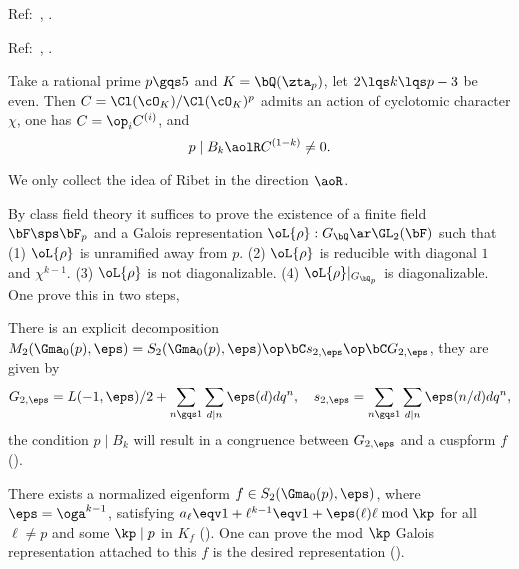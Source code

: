 \documentclass[article, a4paper, twoside]{universal}
\begin{document}
\confighead{}{}{}



\begin{cmt}[0]

Ref:~\cite{Ribet1976Modular,Wiles1980,MW1984}, \cite{Wiles1990Iwasawa}.

Ref:~\cite{Washington1997}, \cite{Rubin1991}.


\begin{thm}
	Take a rational prime $p\gqs5$ and $K=\bQ(\zta_{p})$, let $2\lqs k\lqs p-3$ be even.
	Then $C=\Cl(\cO_{K})/\Cl(\cO_{K})^{p}$ admits an action of cyclotomic character $\chi$, one has $C=\op_{i}C^{(i)}$, and
	\[
		p\mid B_{k}\aolR C^{(1-k)}\neq0.
	\]
\end{thm}

\begin{prf}
	We only collect the idea of Ribet in the direction $\aoR$.

	By class field theory it suffices to prove the existence of a finite field $\bF\sps\bF_{p}$ and a Galois representation $\oL{\rho}:G_{\bQ}\ar\GL_{2}(\bF)$ such that (1) $\oL{\rho}$ is unramified away from $p$. (2) $\oL{\rho}$ is reducible with diagonal $1$ and $\chi^{k-1}$. (3) $\oL{\rho}$ is not diagonalizable. (4) $\oL{\rho}|_{G_{\bQ_{p}}}$ is diagonalizable. One prove this in two steps,

	 There is an explicit decomposition $M_{2}(\Gma_{0}(p),\eps)=S_{2}(\Gma_{0}(p),\eps)\op\bC s_{2,\eps}\op\bC G_{2,\eps}$, they are given by
	\[
		G_{2,\eps}=L(-1,\eps)/2+\sum_{n\gqs1}\sum_{d\mid n}\eps(d)dq^{n},\quad s_{2,\eps}=\sum_{n\gqs1}\sum_{d\mid n}\eps(n/d)dq^{n},
	\]
	the condition $p\mid B_{k}$ will result in a congruence between $G_{2,\eps}$ and a cuspform $f$ (\cite[3.4, 3.5]{Ribet1976Modular}).

	There exists a normalized eigenform $f\in S_{2}(\Gma_{0}(p),\eps)$, where $\eps=\oga^{k-1}$, satisfying $a_{\ell}\eqv1+\ell^{k-1}\eqv1+\eps(\ell)\ell\bmod{\kp}$ for all $\ell\neq p$ and some $\kp\mid p$ in $K_{f}$ (\cite[3.7]{Ribet1976Modular}). One can prove the mod $\kp$ Galois representation attached to this $f$ is the desired representation (\cite[4.2, 4.3, 4.4]{Ribet1976Modular}).
\end{prf}


\end{cmt}

\end{document}
